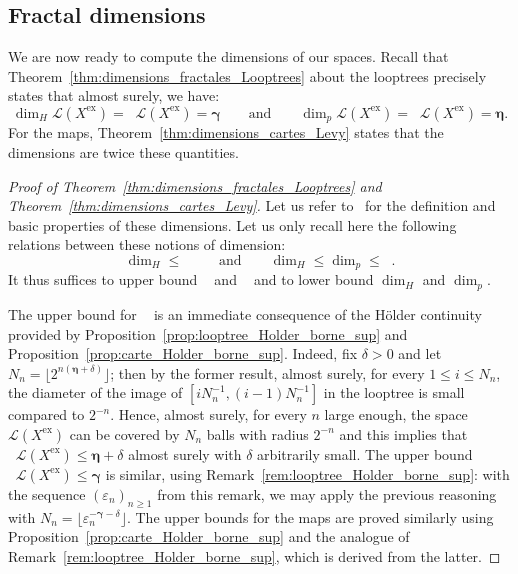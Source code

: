 \documentclass[british, a4paper,11pt]{article}
\numberwithin{equation}{section}
\theoremstyle{definition}
\newcommand{\Loop}{\mathscr{L}}
\DeclareMathOperator{\diminf}{\underline{\dim}}%
\DeclareMathOperator{\dimsup}{\overline{\dim}}%
\newcommand{\bdgamma}{\boldsymbol{\gamma}}
\newcommand{\bdeta}{\boldsymbol{\eta}}
\newcommand{\exc}{\mathrm{ex}}
\begin{document}
\subsection{Fractal dimensions}
\label{ssec:preuves_dimensions}

We are now ready to compute the dimensions of our spaces.
Recall that Theorem~\ref{thm:dimensions_fractales_Looptrees} about the looptrees precisely states that almost surely, we have:
\[\dim_{H} \Loop(X^{\exc}) = \diminf \Loop(X^{\exc}) = \bdgamma
\qquad\text{and}\qquad
\dim_{p} \Loop(X^{\exc}) = \dimsup \Loop(X^{\exc}) = \bdeta.\]
For the maps, Theorem~\ref{thm:dimensions_cartes_Levy} states that the dimensions are twice these quantities.



\begin{proof}[Proof of Theorem~\ref{thm:dimensions_fractales_Looptrees} and Theorem~\ref{thm:dimensions_cartes_Levy}]
Let us refer to~\cite{Mat95} for the definition and basic properties of these dimensions. Let us only recall here 
the following relations between these notions of dimension:
\[\dim_{H} \leq \diminf
\qquad\text{and}\qquad
\dim_{H} \leq \dim_{p} \leq \dimsup.\]
It thus suffices to upper bound $\diminf$ and $\dimsup$ and to lower bound $\dim_{H}$ and $\dim_{p}$.

The upper bound for $\dimsup$ is an immediate consequence of the H\"older continuity provided by Proposition~\ref{prop:looptree_Holder_borne_sup} and Proposition~\ref{prop:carte_Holder_borne_sup}. Indeed, fix $\delta>0$ and let $N_{n} = \lfloor 2^{n(\bdeta+\delta)}\rfloor$; then by the former result, almost surely, for every $1 \leq i \leq N_{n}$, the diameter of the image of $[i N_{n}^{-1}, (i-1) N_{n}^{-1}]$ in the looptree is small compared to $2^{-n}$. Hence, almost surely, for every $n$ large enough, the space $\Loop(X^{\exc})$ can be covered by $N_{n}$ balls with radius $2^{-n}$ and this implies that $\dimsup \Loop(X^{\exc}) \leq \bdeta+\delta$ almost surely with $\delta$ arbitrarily small.
The upper bound $\diminf \Loop(X^{\exc}) \leq \bdgamma$ is similar, using Remark~\ref{rem:looptree_Holder_borne_sup}: with the sequence $(\varepsilon_{n})_{n \geq 1}$ from this remark, we may apply the previous reasoning with $N_{n} = \lfloor \varepsilon_{n}^{-\bdgamma-\delta}\rfloor$.
The upper bounds for the maps are proved similarly using Proposition~\ref{prop:carte_Holder_borne_sup} and the analogue of Remark~\ref{rem:looptree_Holder_borne_sup}, which is derived from the latter.


\end{proof}
\end{document}
